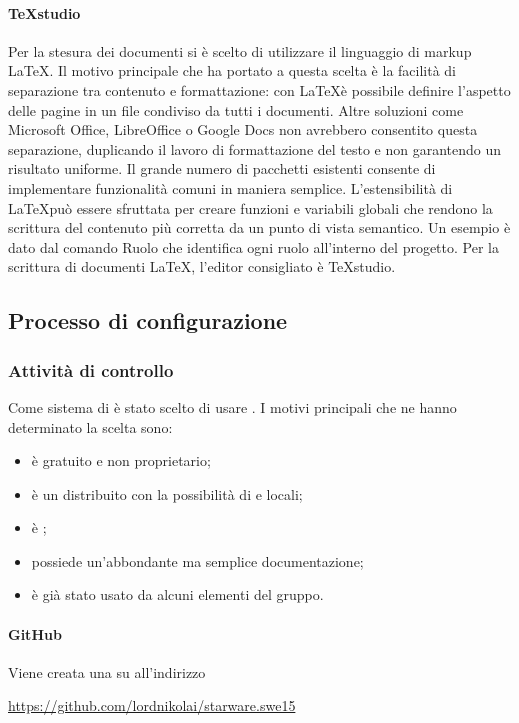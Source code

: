 \documentclass[12pt,a4paper]{article}
\begin{document}
\paragraph{TeXstudio}
Per la stesura dei documenti si è scelto di utilizzare il linguaggio di markup \LaTeX. Il motivo principale che ha portato a questa scelta è la facilità di separazione tra contenuto e formattazione: con \LaTeX è possibile definire l’aspetto delle pagine in un file  condiviso da tutti i documenti. Altre soluzioni come Microsoft Office, LibreOffice o Google Docs non avrebbero consentito questa separazione, duplicando il lavoro di formattazione del testo e non garantendo un risultato uniforme. Il grande numero di pacchetti esistenti consente di implementare funzionalità comuni in maniera semplice. L’estensibilità di \LaTeX può essere sfruttata per creare funzioni e variabili globali che rendono la scrittura del contenuto più corretta da un punto di vista semantico. Un esempio è dato dal comando Ruolo che identifica ogni ruolo all’interno del progetto. Per la scrittura di documenti \LaTeX, l’editor consigliato è TeXstudio.

\subsection{Processo di configurazione} %

\subsubsection{Attività di controllo}\label{versionamento} %
Come sistema di  è stato scelto di usare . I motivi principali che ne hanno determinato la scelta sono:
\begin{itemize}
	\item è gratuito e non proprietario;
	\item è un  distribuito con la possibilità di  e  locali;
	\item è ;
	\item possiede un'abbondante ma semplice documentazione;
	\item è già stato usato da alcuni elementi del gruppo.
\end{itemize}


\paragraph{GitHub} \label{sec:rep} %
Viene creata una  su  all'indirizzo 
\begin{center}
	\url{https://github.com/lordnikolai/starware.swe15}
\end{center}
\end{document}
